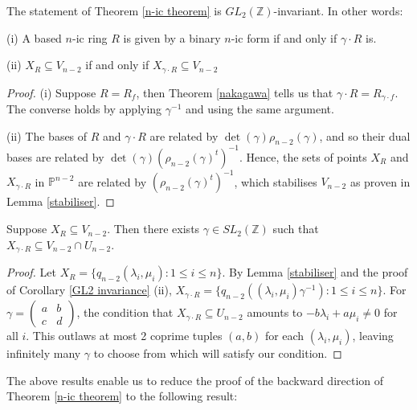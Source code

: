 \documentclass{report}
\begin{document}
\begin{corollary} \label{GL2 invariance}
The statement of Theorem \ref{n-ic theorem} is $GL_2(\mathbb{Z})$-invariant.  In other words:

(i) A based $n$-ic ring $R$ is given by a binary $n$-ic form if and only if $\gamma \cdot R$ is.

(ii) $X_R \subseteq V_{n-2}$ if and only if $X_{\gamma \cdot R} \subseteq V_{n-2}$
\end{corollary}
\begin{proof}
(i) Suppose $R = R_f$, then Theorem \ref{nakagawa} tells us that $\gamma \cdot R = R_{\gamma \cdot f}$.  The converse holds by applying $\gamma^{-1}$ and using the same argument.

(ii) The bases of $R$ and $\gamma \cdot R$ are related by $\det(\gamma) \rho_{n-2}(\gamma)$, and so their dual bases are related by $\det(\gamma) (\rho_{n-2}(\gamma)^t)^{-1}$.  Hence, the sets of points $X_R$ and $X_{\gamma \cdot R}$ in $\mathbb{P}^{n-2}$ are related by $(\rho_{n-2}(\gamma)^t)^{-1}$, which stabilises $V_{n-2}$ as proven in Lemma \ref{stabiliser}.
\end{proof}

\begin{lemma}
Suppose $X_R \subseteq V_{n-2}$.  Then there exists $\gamma \in SL_2(\mathbb{Z})$ such that $X_{\gamma \cdot R} \subseteq V_{n-2} \cap U_{n-2}$.
\end{lemma}
\begin{proof}
Let $X_R = \{ q_{n-2}(\lambda_i, \mu_i) : 1 \leq i \leq n \}$.  By Lemma \ref{stabiliser} and the proof of Corollary \ref{GL2 invariance} (ii), $X_{\gamma \cdot R} = \{ q_{n-2}((\lambda_i, \mu_i) \gamma^{-1}) : 1 \leq i \leq n \}$.  For $\gamma = \begin{pmatrix} a & b \\ c & d \end{pmatrix}$, the condition that $X_{\gamma \cdot R} \subseteq U_{n-2}$ amounts to $ - b \lambda_i + a \mu_i \neq 0$ for all $i$.  This outlaws at most 2 coprime tuples $(a,b)$ for each $(\lambda_i , \mu_i)$, leaving infinitely many $\gamma$ to choose from which will satisfy our condition.
\end{proof}

The above results enable us to reduce the proof of the backward direction of Theorem \ref{n-ic theorem} to the following result:
\end{document}
